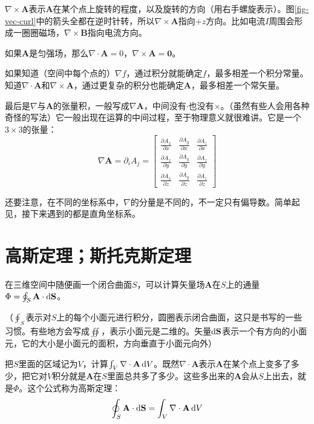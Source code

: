$\nabla \times \mathbf{A}$表示$\mathbf{A}$在某个点上旋转的程度，以及旋转的方向（用右手螺旋表示）。图\ref{fig-vec-curl}中的箭头全都在逆时针转，所以$\nabla \times \mathbf{A}$指向$+z$方向。比如电流$I$周围会形成一圈圈磁场，$\nabla \times \mathbf{B}$指向电流方向。

如果$\mathbf{A}$是匀强场，那么$\nabla \cdot \mathbf{A}=0$，$\nabla \times \mathbf{A}=\mathbf{0}$。

如果知道（空间中每个点的）$\nabla f$，通过积分就能确定$f$，最多相差一个积分常量。知道$\nabla \cdot \mathbf{A}$和$\nabla \times \mathbf{A}$，通过更复杂的积分也能确定$\mathbf{A}$，最多相差一个常矢量。

最后是$\nabla$与$\mathbf{A}$的张量积，一般写成$\nabla \mathbf{A}$，中间没有$\cdot$也没有$\times$。（虽然有些人会用各种奇怪的写法）它一般出现在运算的中间过程，至于物理意义就很难讲。它是一个$3 \times 3$的张量：
\begin{equation}
\nabla \mathbf{A}=\partial_i A_j=\begin{bmatrix}
\frac{\partial A_x}{\partial x} & \frac{\partial A_y}{\partial x} & \frac{\partial A_z}{\partial x} \\
\frac{\partial A_x}{\partial y} & \frac{\partial A_y}{\partial y} & \frac{\partial A_z}{\partial y} \\
\frac{\partial A_x}{\partial z} & \frac{\partial A_y}{\partial z} & \frac{\partial A_z}{\partial z}
\end{bmatrix}
\end{equation}

还要注意，在不同的坐标系中，$\nabla$的分量是不同的，不一定只有偏导数。简单起见，接下来遇到的都是直角坐标系。
\section{高斯定理；斯托克斯定理}
在三维空间中随便画一个闭合曲面$S$，可以计算矢量场$\mathbf{A}$在$S$上的通量$\Phi=\oint_S \mathbf{A} \cdot \mathop{}\!\mathrm{d} \mathbf{S}$。

（$\oint_S$表示对$S$上的每个小面元进行积分，圆圈表示闭合曲面，这只是书写的一些习惯。有些地方会写成$\oiint$，表示小面元是二维的。矢量$\mathop{}\!\mathrm{d} \mathbf{S}$表示一个有方向的小面元，它的大小是小面元的面积，方向垂直于小面元向外）

把$S$里面的区域记为$V$，计算$\int_V \nabla \cdot \mathbf{A} \mathop{}\!\mathrm{d} V$。既然$\nabla \cdot \mathbf{A}$表示$\mathbf{A}$在某个点上变多了多少，把它对$V$积分就是$\mathbf{A}$在$S$里面总共多了多少。这些多出来的$\mathbf{A}$会从$S$上出去，就是$\Phi$。这个公式称为高斯定理：
\begin{equation*}
\oint_S \mathbf{A} \cdot \mathop{}\!\mathrm{d} \mathbf{S}=\int_V \nabla \cdot \mathbf{A} \mathop{}\!\mathrm{d} V
\end{equation*}

